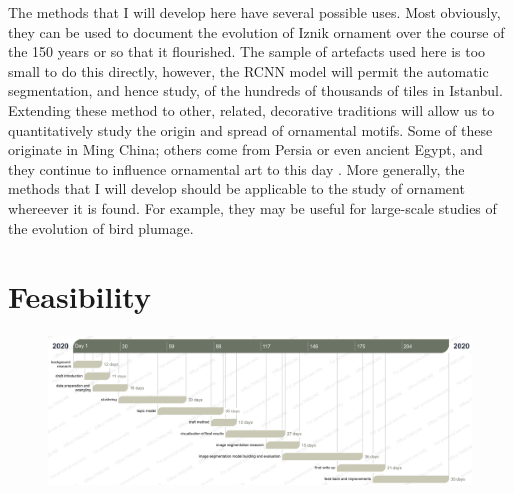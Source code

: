 \documentclass[10pt]{article}
\begin{document}
The methods that I will develop here have several possible uses.  Most obviously, they can be used to document the evolution of Iznik ornament over the course of the 150 years or so that it flourished.  The sample of artefacts used here is too small to do this directly, however, the RCNN model will permit the automatic segmentation, and hence study, of the hundreds of thousands of tiles in Istanbul. Extending these method to other, related, decorative traditions will allow us to quantitatively study the origin and spread of ornamental motifs. Some of these originate in Ming China; others come from Persia or even ancient Egypt, and they continue to influence ornamental art to this day \parencite{Jones1856, Riegl1992, Brolio2016}. More generally, the methods that I will develop should be applicable to the study of ornament whereever it is found. For example, they may be useful for large-scale studies of the evolution of bird plumage. 








\section*{Feasibility}
\paragraph{} 
\begin{figure}[H]
\begin{center}
\includegraphics[scale=0.4]{Proposal/gantt.png}
\end{center}
\end{figure}
\end{document}
